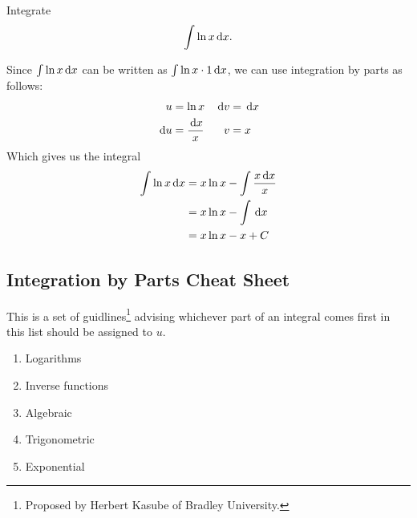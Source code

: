 \begin{ex}
  Integrate
  \[\int\ln x \,\mathrm{d} x.\]
  \begin{sol}
  Since $\int \ln x \,\mathrm{d} x$ can be written as $\int \ln x \cdot 1 \,\mathrm{d} x$, we can use integration by parts as follows:
  \begin{align*}
    u&=\ln x & \,\mathrm{d} v &= \,\mathrm{d} x \\
    \,\mathrm{d} u &= \frac{\,\mathrm{d} x }{x} & v&=x
  \end{align*}
  Which gives us the integral
  \begin{align*}
    \int\ln x \,\mathrm{d} x &=
      x \ln x - \int  \frac{x \,\mathrm{d} x}{x} \\
      &= x \ln x - \int \,\mathrm{d} x \\
      &= x \ln x - x + C
    \end{align*}
  \end{sol}
\end{ex}

\subsection{Integration by Parts Cheat Sheet}
This is a set of guidlines\footnote{Proposed by Herbert Kasube of Bradley University.} advising whichever part of an integral comes first in this list should be assigned to $u$.
\begin{enumerate}
  \item Logarithms
  \item Inverse functions
  \item Algebraic
  \item Trigonometric
  \item Exponential
\end{enumerate}


